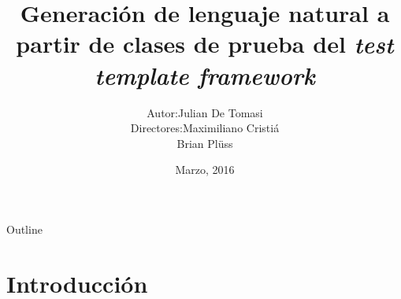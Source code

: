 \documentclass{beamer}
\begin{document}
	
\title[NLG a partir de clases de prueba del TTF]{Generación de lenguaje natural a partir de clases de prueba del \textit{test template framework}}
\author[Julian De Tomasi]{\begin{tabular}{r@{ }l} 
  Autor:      & Julian De Tomasi \\[1ex]
  Directores: & Maximiliano Cristiá\\
  & Brian Plüss
  \end{tabular}}
\date{Marzo, 2016}
	
\begin{frame}
  \titlepage
\end{frame}
	
\begin{frame}{Outline}
  \tableofcontents
\end{frame}
	
\section{Introducción}
	
\end{document}
